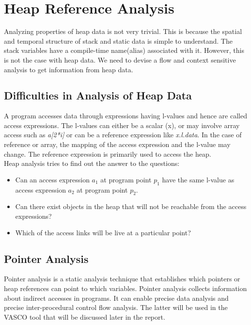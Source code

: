 \chapter{Heap Reference Analysis}

Analyzing properties of heap data is not very trivial. This is because the spatial and temporal structure of stack and static data is simple to understand. The stack variables have a compile-time name(alias) associated with it. However, this is not the case with heap data. We need to devise a flow and context sensitive analysis to get information from heap data. 

\section{Difficulties in Analysis of Heap Data}

A program accesses data through expressions having l-values and hence are called access expressions. The l-values can either be a scalar (x), or may involve array access such as \emph{a[2*i]} or can be a reference expression like \emph{x.l.data}. In the case of reference or array, the mapping of the access expression and the l-value may change. The reference expression is primarily used to access the heap.\cite{hra} \\

Heap analysis tries to find out the answer to the questions: 
\begin{itemize}
	\item Can an access expression $a_1$ at program point $p_1$ have the same l-value as access expression $a_2$ at program  point $p_2$.
	\item Can there exist objects in the heap that will not be reachable from the access expressions?
	\item Which of the access links will be live at a particular point?
\end{itemize}
  

\section {Pointer Analysis}

Pointer analysis is a static analysis technique that establishes which pointers or heap references can point to which variables. Pointer analysis collects information about indirect accesses in programs. It can enable precise data analysis and precise inter-procedural control flow analysis. The latter will be used in the VASCO tool that will be discussed later in the report. \\

